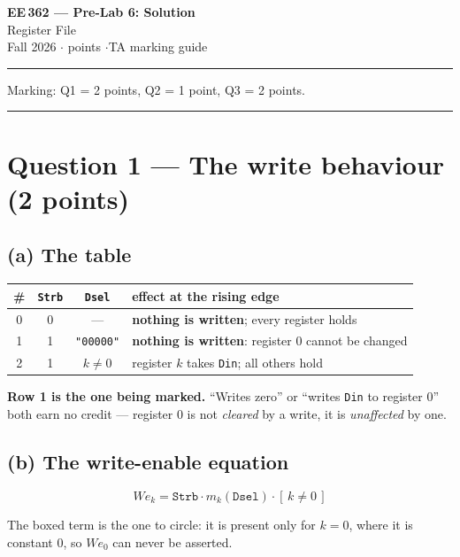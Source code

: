 \documentclass[11pt]{article}
\newcommand{\code}[1]{\texttt{#1}}
\newcommand{\hr}{\vspace{2pt}\hrule\vspace{6pt}}
\begin{document}
\begin{center}
{\Large\bfseries EE\,362 --- Pre-Lab 6: Solution}\\[2pt]
{\large Register File}\\[4pt]
Fall 2026 \quad$\cdot$ points \quad$\cdot$\quad TA marking guide
\end{center}
\hr

{\small Marking: Q1 = 2 points, Q2 = 1 point, Q3 = 2 points.}

\vspace{4pt}\hr

\section*{Question 1 --- The write behaviour (2 points)}

\subsection*{(a) The table}

\begin{center}
\begin{tabular}{c|cc|l}
\toprule
\# & \code{Strb} & \code{Dsel} & effect at the rising edge \\
\midrule
0 & 0 & --- & \textbf{nothing is written}; every register holds \\
1 & 1 & \code{"00000"} & \textbf{nothing is written}: register 0 cannot be changed \\
2 & 1 & $k \neq 0$ & register $k$ takes \code{Din}; all others hold \\
\bottomrule
\end{tabular}
\end{center}

\textbf{Row 1 is the one being marked.} ``Writes zero'' or ``writes \code{Din} to
register 0'' both earn no credit --- register 0 is not \emph{cleared} by a write,
it is \emph{unaffected} by one.

\subsection*{(b) The write-enable equation}

\[
\mathit{We}_k = \code{Strb} \cdot m_k(\code{Dsel}) \cdot \boxed{[\,k \neq 0\,]}
\]

The boxed term is the one to circle: it is present only for $k = 0$, where it is
constant 0, so $\mathit{We}_0$ can never be asserted.
\end{document}
